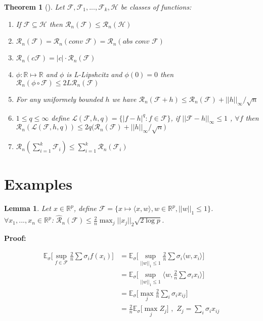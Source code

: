 \documentclass[10pt]{article}
\newcounter{lecnum}
\newtheorem{theorem}{Theorem}[lecnum]
\newtheorem{lemma}[lemma]{Lemma}
\renewcommand{\hat}{\widehat}
\begin{document}
\begin{theorem}[\cite{bartlett_rademacher_2003}]
	Let $\mathcal{F},\mathcal{F}_1,...,\mathcal{F}_k,\mathcal{H}$ be classes of functions:
	\begin{enumerate}
		\item [(1)] If $\mathcal{F} \subseteq \mathcal{H}$ then $\mathcal{R}_n(\mathcal{F}) \le \mathcal{R}_n(\mathcal{H})$
		\item [(2)] $\mathcal{R}_n(\mathcal{F})=\mathcal{R}_n(conv\,\, \mathcal{F})=\mathcal{R}_n(abs \,\, conv \,\, \mathcal{F})$
		\item [(3)]  $\mathcal{R}_n(c\mathcal{F})=|c| \cdot \mathcal{R}_n(\mathcal{F})$
		\item [(4)] $\phi:\mathbb{R} \longmapsto \mathbb{R}$ and $\phi$ is L-Lipshcitz and $\phi(0)=0$ then $\mathcal{R}_n(\phi \circ \mathcal{F}) \le 2L \mathcal{R}_n(\mathcal{F})$
		\item [(5)] For any uniformely bounded $h$ we have $\mathcal{R}_n(\mathcal{F}+h) \le \mathcal{R}_n(\mathcal{F})+||h||_\infty / \sqrt{n}$
		\item [(6)] $1 \le q \le \infty$ define $\mathcal{L}(\mathcal{F},h,q)=\{|f-h|^q: f \in \mathcal{F}\}$, if $||\mathcal{F}-h||_\infty \le 1$ , $\forall f$ then $\mathcal{R}_n(\mathcal{L}(\mathcal{F},h,q)) \le 2q\big( \mathcal{R}_n(\mathcal{F}) + ||h||_\infty / \sqrt{n} \big)$
		\item [(7)] $\mathcal{R}_n(\sum_{i=1}^{k}\mathcal{F}_i) \le \sum_{i=1}^{k} \mathcal{R}_n(\mathcal{F}_i)$
	\end{enumerate}
\end{theorem}

\section{Examples}

\begin{lemma}
	Let $x \in \mathbb{R}^p$, define $\mathcal{F}=\{x \longmapsto \langle x,w \rangle , w \in \mathbb{R}^p , ||w||_1 \le 1\}$. $\forall x_1,...,x_n \in \mathbb{R}^p$: $\hat{\mathcal{R}}_n(\mathcal{F}) \le \frac{2}{n} \max_j ||x_j||_2 \sqrt{2\log p}$.
\end{lemma}

\textbf{Proof:}

\begin{equation}
\begin{aligned}
\mathbb{E}_\sigma \bigg[ \sup_{f \in \mathcal{F}} \frac{2}{n} \sum\sigma_i f(x_i) \bigg] & =  \mathbb{E}_\sigma \bigg[ \sup_{||w||_1 \le 1} \frac{2}{n} \sum\sigma_i \langle w,x_i \rangle \bigg]\\
 & =  \mathbb{E}_\sigma \bigg[ \sup_{||w||_1 \le 1} \langle w,\frac{2}{n} \sum\sigma_ix_i \rangle \bigg]\\
  & =  \mathbb{E}_\sigma \bigg[ \max_{j}\frac{2}{n} \sum_i \sigma_i x_{ij} \bigg]\\
  & =  \frac{2}{n} \mathbb{E}_\sigma \bigg[ \max_{j} Z_j \bigg] \,\, , \,\, Z_j=\sum_i \sigma_i x_{ij}\\
\end{aligned}
\end{equation}
\end{document}
